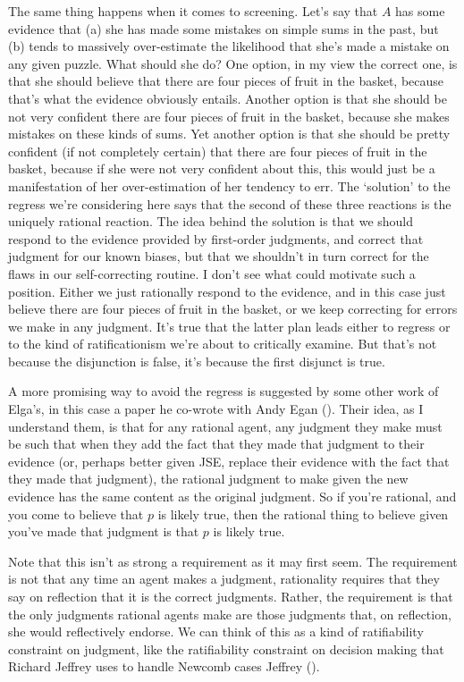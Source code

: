 \documentclass[
  11pt,
  letterpaper,
  DIV=11,
  numbers=noendperiod,
  oneside]{scrartcl}
\begin{document}
The same thing happens when it comes to screening. Let's say that \(A\)
has some evidence that (a) she has made some mistakes on simple sums in
the past, but (b) tends to massively over-estimate the likelihood that
she's made a mistake on any given puzzle. What should she do? One
option, in my view the correct one, is that she should believe that
there are four pieces of fruit in the basket, because that's what the
evidence obviously entails. Another option is that she should be not
very confident there are four pieces of fruit in the basket, because she
makes mistakes on these kinds of sums. Yet another option is that she
should be pretty confident (if not completely certain) that there are
four pieces of fruit in the basket, because if she were not very
confident about this, this would just be a manifestation of her
over-estimation of her tendency to err. The `solution' to the regress
we're considering here says that the second of these three reactions is
the uniquely rational reaction. The idea behind the solution is that we
should respond to the evidence provided by first-order judgments, and
correct that judgment for our known biases, but that we shouldn't in
turn correct for the flaws in our self-correcting routine. I don't see
what could motivate such a position. Either we just rationally respond
to the evidence, and in this case just believe there are four pieces of
fruit in the basket, or we keep correcting for errors we make in any
judgment. It's true that the latter plan leads either to regress or to
the kind of ratificationism we're about to critically examine. But
that's not because the disjunction is false, it's because the first
disjunct is true.

A more promising way to avoid the regress is suggested by some other
work of Elga's, in this case a paper he co-wrote with Andy Egan
(). Their idea, as I
understand them, is that for any rational agent, any judgment they make
must be such that when they add the fact that they made that judgment to
their evidence (or, perhaps better given JSE, replace their evidence
with the fact that they made that judgment), the rational judgment to
make given the new evidence has the same content as the original
judgment. So if you're rational, and you come to believe that \(p\) is
likely true, then the rational thing to believe given you've made that
judgment is that \(p\) is likely true.

Note that this isn't as strong a requirement as it may first seem. The
requirement is not that any time an agent makes a judgment, rationality
requires that they say on reflection that it is the correct judgments.
Rather, the requirement is that the only judgments rational agents make
are those judgments that, on reflection, she would reflectively endorse.
We can think of this as a kind of ratifiability constraint on judgment,
like the ratifiability constraint on decision making that Richard
Jeffrey uses to handle Newcomb cases Jeffrey
().
\end{document}
